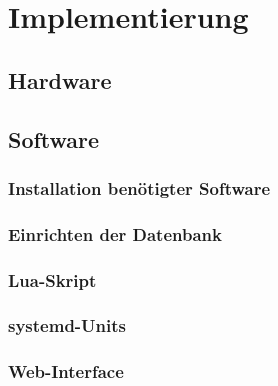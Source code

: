 \chapter{Implementierung}

\section{Hardware}


\section{Software}

\subsection{Installation ben\"otigter Software}


\subsection{Einrichten der Datenbank}


\subsection{Lua-Skript}


\subsection{systemd-Units}


\subsection{Web-Interface}
